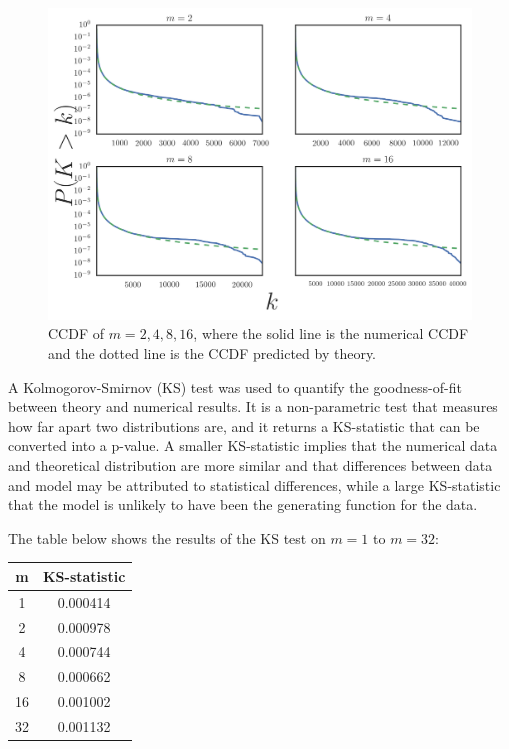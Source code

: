 \begin{figure}
    \centering
    \includegraphics[height=0.7\linewidth]{img/ccdf}
    \caption{CCDF of $m=2, 4, 8, 16$, where the solid line is the numerical CCDF and the dotted line is the CCDF predicted by theory.}
    \label{fig:ccdf}
\end{figure}

A Kolmogorov-Smirnov (KS) test was used to quantify the goodness-of-fit between theory and numerical results. It is a non-parametric test that measures how far apart two distributions are, and it returns a KS-statistic that can be converted into a p-value. A smaller KS-statistic implies that the numerical data and theoretical distribution are more similar and that differences between data and model may be attributed to statistical differences, while a large KS-statistic that the model is unlikely to have been the generating function for the data. 

The table below shows the results of the KS test on $m = 1$ to $m=32$:

\begin{center}
\begin{tabular}{ c | c }
 m &  KS-statistic \\ 
 \hline
 1 & 0.000414 \\  
 2 & 0.000978 \\
 4 & 0.000744 \\
 8 & 0.000662 \\
 16 & 0.001002 \\
 32 & 0.001132 \\  
\end{tabular}
\label{table:ks-test}
\end{center}

